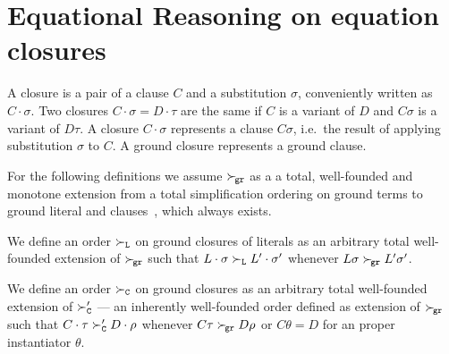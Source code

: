 \section{Equational Reasoning on equation closures}\label{sec:reasoning:on:equational:closures}

\begin{definition}
    A closure is a pair of a clause \( C \) and a substitution \( \sigma \),
    conveniently written as \( C\cdot\sigma \). Two closures \( C\cdot\sigma = D\cdot\tau \)
    are the same if \( C \) is a variant of \( D \) and \( C\sigma \) is a variant of \( D\tau \).
    A closure \( C\cdot\sigma \) represents a clause \( C\sigma \),
    i.e.~the result of applying substitution \( \sigma \) to \( C \).
    A ground closure represents a ground clause.
\end{definition}

For the following definitions we assume
\( \mathrel\succ_{\!\mathtt{gr}} \) as a a total, well-founded and monotone extension
from a total simplification ordering on ground terms
to ground literal and clauses~\cite{NR2001},
which always exists.


\begin{definition}
    We define an order \( \mathrel\succ_{\mathtt{L}} \) on ground closures of literals
    as an arbitrary total well-founded extension of \( \mathrel\succ_{\!\mathtt{gr}} \)
    such that
    \( L\cdot\sigma\mathrel\succ_{\mathtt{L}} L'\cdot\sigma' \) whenever
    \( L\sigma\mathrel\succ_{\!\mathtt{gr}} L'\sigma' \).

    We define an order \( \mathrel\succ_{\mathtt{C}} \) on ground closures
    as an arbitrary total well-founded extension of
    \( \mathrel\succ_{\mathtt{C}}' \) --- an inherently well-founded order defined as extension of \( \mathrel\succ_{\!\mathtt{gr}} \)
    such that
    \( C\cdot\tau\mathrel\succ_{\mathtt{C}}' D\cdot\rho \) whenever
    \( C\tau\mathrel\succ_{\!\mathtt{gr}} D\rho \) or \( C\theta = D \) for an proper instantiator \( \theta \).
\end{definition}

